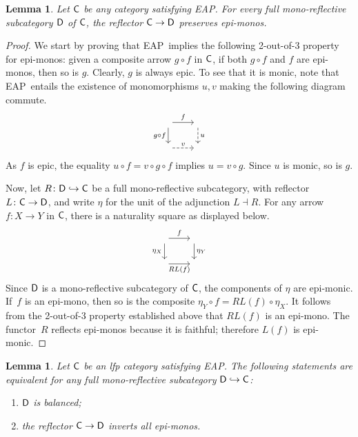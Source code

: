 \documentclass[a4paper,10pt,reqno]{amsart}
\newtheorem{lemma}[theorem]{Lemma}
\theoremstyle{definition}
\theoremstyle{remark}
\newcommand{\cat}{{\sf C}}								%
\newcommand{\catt}{{\sf D}}								%
\newcommand{\into}{\hookrightarrow}						%
\newcommand{\EAP}{\textnormal{EAP}}
\begin{document}
\begin{lemma}\label{l:Ringel-restated}
Let $\cat$ be any category satisfying \EAP. For every full mono-reflective subcategory $\catt$ of $\cat$, the reflector $\cat \to \catt$ preserves epi-monos.
\end{lemma}
%
\begin{proof}
We start by proving that \EAP~implies the following 2-out-of-3 property for epi-monos: given a composite arrow $g\circ f$ in $\cat$, if both $g\circ f$ and $f$ are epi-monos, then so is $g$. Clearly, $g$ is always epic. To see that it is monic, note that \EAP~entails the existence of monomorphisms $u,v$ making the following diagram commute.
\[\begin{tikzcd}[cells={nodes={inner sep=2pt, outer sep=1pt}}]
\phantom{\cdot} \arrow{r}{f} \arrow{d}[swap]{g\circ f} & \phantom{\cdot} \arrow[dashed]{d}{u} \\
\phantom{\cdot} \arrow[dashed]{r}{v} & \phantom{\cdot}
\end{tikzcd}\]
%
As $f$ is epic, the equality $u\circ f = v\circ g\circ f$ implies $u= v\circ g$. Since $u$ is monic, so is $g$. 


Now, let $R\colon \catt\into\cat$ be a full mono-reflective subcategory, with reflector $L\colon \cat\to\catt$, and write $\eta$ for the unit of the adjunction $L\dashv R$. For any arrow $f\colon X\to Y$ in $\cat$, there is a naturality square as displayed below.
\[\begin{tikzcd}[cells={nodes={inner sep=2pt, outer sep=1pt}}]
\phantom{\cdot} \arrow{r}{f} \arrow{d}[swap]{\eta_{X}} & \phantom{\cdot} \arrow{d}{\eta_{Y}} \\
\phantom{\cdot} \arrow{r}[swap]{RL(f)} & \phantom{\cdot}
\end{tikzcd}\]
Since $\catt$ is a mono-reflective subcategory of $\cat$, the components of $\eta$ are epi-monic. If~$f$ is an epi-mono, then so is the composite $\eta_{Y}\circ f = RL(f)\circ \eta_{X}$. It follows from the 2-out-of-3 property established above that $RL(f)$ is an epi-mono. The functor~$R$ reflects epi-monos because it is faithful; therefore $L(f)$ is epi-monic.
\end{proof}


\begin{lemma}\label{l:equivalent-problems}
Let $\cat$ be an lfp category satisfying \EAP.
The following statements are equivalent for any full mono-reflective subcategory $\catt \into \cat$:
\begin{enumerate}[label=(\arabic*)]
\item\label{i:catt-balanced} $\catt$ is balanced;
\item\label{i:inverts-epi-monos} the reflector $\cat\to\catt$ inverts all epi-monos.
\end{enumerate}
\end{lemma}
\end{document}
